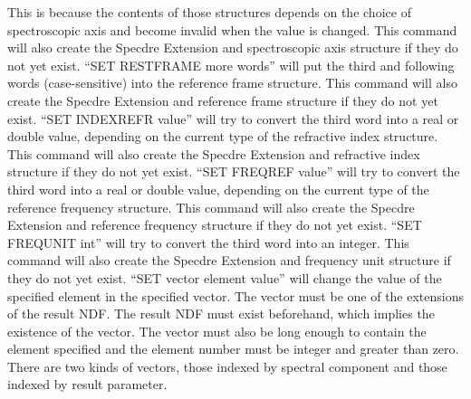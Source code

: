 {{{            This is because the contents of those structures depends on
            the choice of spectroscopic axis and become invalid when the
            value is changed. This command will also create the Specdre
            Extension and spectroscopic axis structure if they do not
            yet exist.
         \sstitem
         ``SET RESTFRAME more words'' will put the third and following
            words (case-sensitive) into the reference frame structure.
            This command will also create the Specdre Extension and
            reference frame structure if they do not yet exist.
         \sstitem
         ``SET INDEXREFR value'' will try to convert the third word
            into a real or double value, depending on the current type
            of the refractive index structure. This command will also
            create the Specdre Extension and refractive index structure
            if they do not yet exist.
         \sstitem
         ``SET FREQREF value'' will try to convert the third word
            into a real or double value, depending on the current type
            of the reference frequency structure. This command will also
            create the Specdre Extension and reference frequency
            structure if they do not yet exist.
         \sstitem
         ``SET FREQUNIT int'' will try to convert the third word into
            an integer. This command will also create the Specdre
            Extension and frequency unit structure if they do not yet
            exist.
      }
      ``SET vector element value'' will change the value of the
      specified element in the specified vector. The vector must be
      one of the extensions of the result NDF. The result NDF must
      exist beforehand, which implies the existence of the vector.
      The vector must also be long enough to contain the element
      specified and the element number must be integer and greater
      than zero. There are two kinds of vectors, those indexed by
      spectral component and those indexed by result parameter.
      }}
